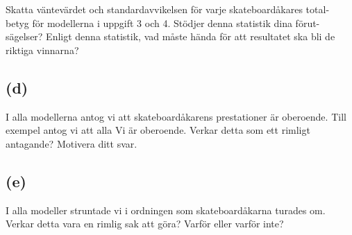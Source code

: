 \documentclass{assignment}
\begin{document}
Skatta väntevärdet och standardavvikelsen för varje skateboardåkares total-
betyg för modellerna i uppgift 3 och 4. Stödjer denna statistik dina förut-
sägelser? Enligt denna statistik, vad måste hända för att resultatet ska bli de
riktiga vinnarna?

\subsection*{(d)}

I alla modellerna antog vi att skateboardåkarens prestationer är oberoende.
Till exempel antog vi att alla Vi är oberoende. Verkar detta som ett rimligt
antagande? Motivera ditt svar.

\subsection*{(e)}

I alla modeller struntade vi i ordningen som skateboardåkarna turades om.
Verkar detta vara en rimlig sak att göra? Varför eller varför inte?
%  
\end{document}
